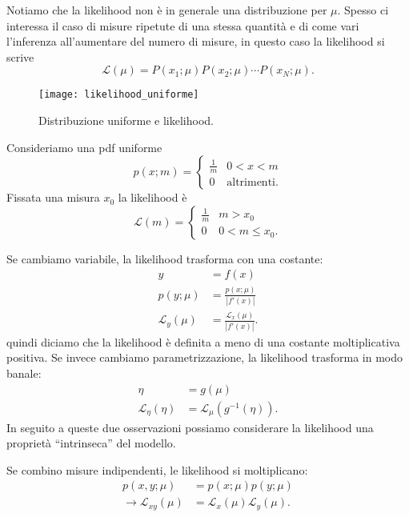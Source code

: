 Notiamo che la likelihood non è in generale una distribuzione per $\mu$.
Spesso ci interessa il caso di misure ripetute di una stessa quantità e di come vari l'inferenza all'aumentare del numero di misure, in questo caso la likelihood si scrive
\begin{equation*}
	\mathcal L(\mu) = P(x_1;\mu) P(x_2;\mu) \dotsm P(x_N;\mu).
\end{equation*}

\begin{example}
	\begin{figure}
		\centering
		\texttt{[image: likelihood\_uniforme]}
		\caption{Distribuzione uniforme e likelihood.}
	\end{figure}
	Consideriamo una pdf uniforme
	\begin{equation*}
		p(x;m) = \begin{cases}
			\frac 1m & 0<x<m \\
			0 & \text{altrimenti.}
		\end{cases}
	\end{equation*}
	Fissata una misura $x_0$ la likelihood è
	\begin{equation*}
		\mathcal L(m) = \begin{cases}
			\frac 1m & m > x_0 \\
			0 & 0 < m \le x_0.
		\end{cases}
	\end{equation*}
\end{example}

Se cambiamo variabile, la likelihood trasforma con una costante:
\begin{align*}
	y &= f(x) \\
	p(y;\mu) &= \frac{p(x;\mu)}{|f'(x)|} \\
	\mathcal L_y(\mu) &= \frac{\mathcal L_x(\mu)}{|f'(x)|}.
\end{align*}
quindi diciamo che la likelihood è definita a meno di una costante moltiplicativa positiva.
Se invece cambiamo parametrizzazione, la likelihood trasforma in modo banale:
\begin{align*}
	\eta &= g(\mu) \\
	\mathcal L_\eta(\eta) &= \mathcal L_\mu(g^{-1}(\eta)).
\end{align*}
In seguito a queste due osservazioni possiamo considerare la likelihood una proprietà ``intrinseca'' del modello.

Se combino misure indipendenti, le likelihood si moltiplicano:
\begin{align*}
	p(x,y;\mu) &= p(x;\mu) p(y;\mu) \\
	\rightarrow \mathcal L_{xy}(\mu) &= \mathcal L_x(\mu) \mathcal L_y(\mu).
\end{align*}

